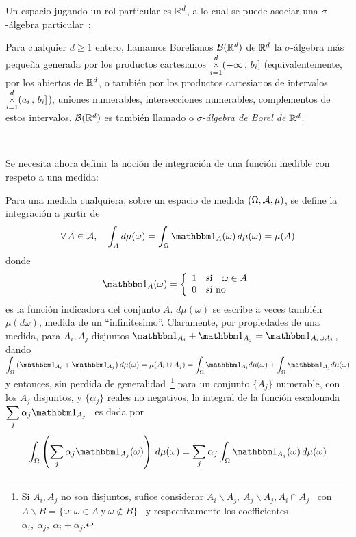Un espacio  jugando un rol particular es  $\mathbb{R}^d$, a lo cual  se puede asociar
una $\sigma$-\'algebra particular~\cite{AthLah06, Bog07:v1, Bog07:v2, Coh13}:
%
\begin{definicion}
  Para  cualquier  $d  \ge  1$  entero,  llamamos  Borelianos  $\mathcal{B}(\mathbb{R}^d)$  de
  $\mathbb{R}^d$  la $\sigma$-\'algebra  m\'as peque\~na  generada por  los productos
  cartesianos   $\displaystyle   \operatorname*{\times}_{i=1}^d  (-\infty   \,   ;  \,   b_i]$
  \big(equivalentemente,  por los  abiertos de  $\mathbb{R}^d$, o  tambi\'en  por los
  productos cartesianos de intervalos  $\displaystyle \operatorname*{\times}_{i=1}^d (a_i \, ;
  \, b_i]$\big), \ie uniones numerables, intersecciones numerables, complementos
  de   estos   intervalos.    $\mathcal{B}(\mathbb{R}^d)$   es  tambi\'en   llamado   o   {\it
    $\sigma$-\'algebra de Borel de $\mathbb{R}^d$}.
\end{definicion}

\

Se necesita ahora definir la  noci\'on de integraci\'on de una funci\'on medible
con respeto a una medida:
%
\begin{definicion}
  Para una medida  cualquiera, sobre un espacio de  medida $(\Omega,\mathcal{A},\mu)$, se
  define la integraci\'on a partir de
  \[
  \forall \, A \in \A,  \quad \int_A d\mu(\omega) = \int_\Omega \un_A(\omega) \,
  d\mu(\omega) = \mu(A)
  \]
  donde
  \[
  \un_A(\omega) = \left\{
  \begin{array}{clr}
  1 & \mbox{si} \quad \omega \in A\\
  0 & \mbox{si no}
  \end{array} \right.
  \]
  es  la funci\'on  indicadora del  conjunto $A$.   $d\mu(\omega)$ se  escribe a
  veces  tambi\'en $\mu(d\omega)$, medida  de un  ``infinitesimo''.  Claramente,
  por  propiedades  de una  medida,  para $  A_i,  A_j$  disjuntos $\un_{A_i}  +
  \un_{A_j}  =  \un_{A_i \cup  A_i}$,  dando  $\displaystyle \int_\Omega  \left(
    \un_{A_i} + \un_{A_j} \right) d\mu(\omega) = \mu(A_i \cup A_j) = \int_\Omega
  \un_{A_i} d\mu(\omega)  + \int_\Omega \un_{A_j} d\mu(\omega)$  y entonces, sin
  perdida  de  generalidad~\footnote{Si  $A_i,  A_j$ no  son  disjuntos,  sufice
    considerar $A_i\backslash A_j, \: A_j\backslash  A_j, A_i \cap A_j$ \ con $A
    \backslash B = \{ \omega: \omega \in  A \: \mbox{y} \: \omega \not\in B\}$ \
    y respectivamente los coefficientes \  $\alpha_i, \: \alpha_j, \: \alpha_i +
    \alpha_j$.}   para  un  conjunto  $\{  A_j  \}$  numerable,  con  los  $A_j$
  disjuntos, y $\{ \alpha_j \}$ reales no negativos, la integral de la funci\'on
  escalonada \ $\displaystyle \sum_j \alpha_j \un_{A_j}$ \ es dada por
  \[
  \int_\Omega \left( \sum_j \alpha_j \un_{A_j}(\omega) \right) \, d\mu(\omega) =
  \sum_j \alpha_j \int_\Omega \un_{A_j}(\omega) \, d\mu(\omega)
  \]
\end{definicion}


